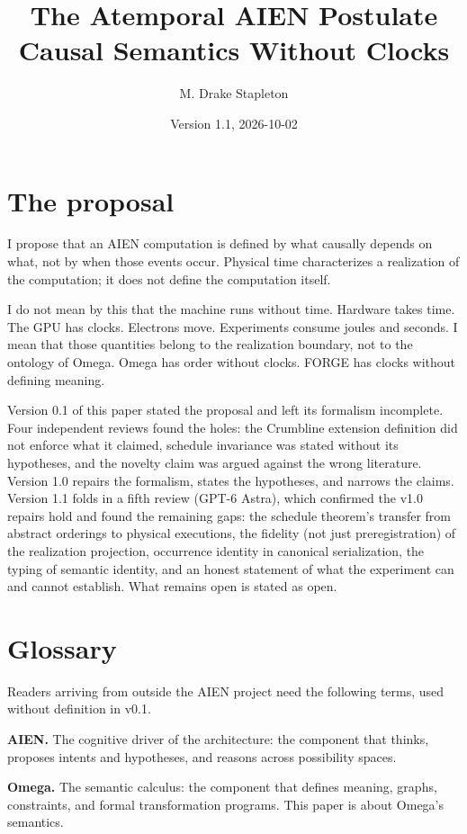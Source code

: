 \documentclass[11pt]{article}
\title{The Atemporal AIEN Postulate\\Causal Semantics Without Clocks}
\author{M. Drake Stapleton}
\date{Version 1.1, 2026-10-02}
\begin{document}
\maketitle

\section{The proposal}

I propose that an AIEN computation is defined by what causally depends on what, not by when those events occur. Physical time characterizes a realization of the computation; it does not define the computation itself.

I do not mean by this that the machine runs without time. Hardware takes time. The GPU has clocks. Electrons move. Experiments consume joules and seconds. I mean that those quantities belong to the realization boundary, not to the ontology of Omega. Omega has order without clocks. FORGE has clocks without defining meaning.

Version 0.1 of this paper stated the proposal and left its formalism incomplete. Four independent reviews found the holes: the Crumbline extension definition did not enforce what it claimed, schedule invariance was stated without its hypotheses, and the novelty claim was argued against the wrong literature. Version 1.0 repairs the formalism, states the hypotheses, and narrows the claims. Version 1.1 folds in a fifth review (GPT-6 Astra), which confirmed the v1.0 repairs hold and found the remaining gaps: the schedule theorem's transfer from abstract orderings to physical executions, the fidelity (not just preregistration) of the realization projection, occurrence identity in canonical serialization, the typing of semantic identity, and an honest statement of what the experiment can and cannot establish. What remains open is stated as open.

\section{Glossary}

Readers arriving from outside the AIEN project need the following terms, used without definition in v0.1.

\textbf{AIEN.} The cognitive driver of the architecture: the component that thinks, proposes intents and hypotheses, and reasons across possibility spaces.

\textbf{Omega.} The semantic calculus: the component that defines meaning, graphs, constraints, and formal transformation programs. This paper is about Omega's semantics.
\end{document}
